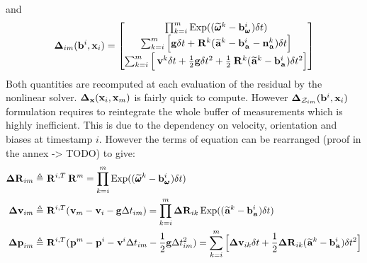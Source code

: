 %
and 
%
\begin{align}
    {\bm \Delta}_{im}({\bf b}^i, {\bf x}_i) = 
    \begin{bmatrix}
    \prod_{k=i}^{m} \operatorname*{Exp}((\prescript{}{}{\widetilde{\pmb{\omega}}}_{}^k - {\bf b}_{\prescript{}{}{\pmb{\omega}}_{}}^i)\delta t)  \\
    \sum_{k=i}^{m} \Big[{\bf g} \delta t + \prescript{}{}{{\bf R}}_{}^{k}(\prescript{}{}{\widetilde{{\bf a}}}_{}^k - {\bf b}_{\prescript{}{}{{\bf a}}_{}}^i - {\bf n}_{\prescript{}{}{{\bf a}}_{}}^k)\delta t \Big]  \\
    \sum_{k=i}^{m} \Big[\prescript{}{}{{\bf v}}_{}^{k}\delta t + \frac{1}{2}{\bf g} \delta t^2 
    + \frac{1}{2}\prescript{}{}{{\bf R}}_{}^{k}(\prescript{}{}{\widetilde{{\bf a}}}_{}^k - {\bf b}_{\prescript{}{}{{\bf a}}_{}}^i)\delta t^2 \Big]
    \end{bmatrix}
\end{align}
%
Both quantities are recomputed at each evaluation of the residual by the nonlinear solver. ${\bm \Delta}_{{\bf x}}({\bf x}_i, {\bf x}_m)$ is fairly quick to compute.
However ${\bm \Delta}_{\mathcal{Z}_{im}}({\bf b}^i, {\bf x}_i)$ formulation requires to reintegrate the whole buffer of measurements which
is highly inefficient. This is due to the dependency on velocity, orientation and biases at timestamp $i$. However the terms of equation  can 
be rearranged (proof in the annex -> TODO) to give:
%
%
\begin{equation}
    \begin{split}
    \DR_{im} &\triangleq  \Rot{}{}^{i,T} \Rot{}{}^{m} =  \prod_{k=i}^{m} \Exp((\angvelm{}{}^k - \bias_{\angvel{}{}}^i)\dt) \\
    \Dv_{im} &\triangleq \Rot{}{}^{i,T} (\vel{}{m} - \vel{}{i} - \grav \Dt_{im}) 
    = \prod_{k=i}^{m} \DR_{ik} \Exp((\accm{}{}^k - \bias_{\acc{}{}}^i)\dt)  \\
    \Dp_{im} &\triangleq \Rot{}{}^{i,T}(\posi{}{}^m - \posi{}{}^i - \vel{}{}^i \Dt_{im} - \frac{1}{2} \grav \Dt_{im}^2) 
    = \sum_{k=i}^{m} \Big[\Dv_{ik}\dt +  \frac{1}{2} \DR_{ik} (\accm{}{}^k - \bias_{\acc{}{}}^i)\dt^2 \Big]
    \end{split}
    \label{eq:IMUPreintij}
\end{equation}
